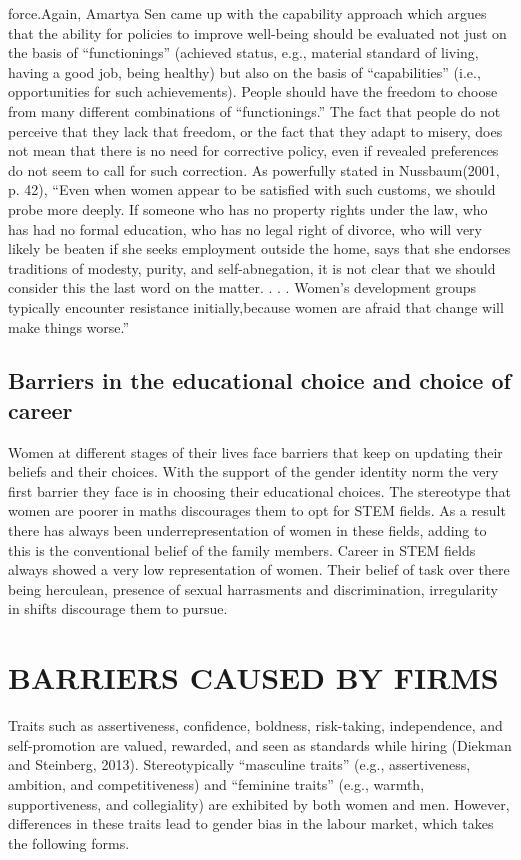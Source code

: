\documentclass[12pt]{article}
\begin{document}
force.Again, Amartya Sen came up with the capability approach which argues that the ability
for policies to improve well-being should be evaluated not just on the basis of “functionings”
(achieved status, e.g., material standard of living, having a good job, being healthy) but also
on the basis of “capabilities” (i.e., opportunities for such achievements). People should have
the freedom to choose from many different combinations of “functionings.” The fact that
people do not perceive that they lack that freedom, or the fact that they adapt to misery, does
not mean that there is no need for corrective policy, even if revealed preferences do not seem
to call for such correction. As powerfully stated in Nussbaum(2001, p. 42),
“Even when women appear to be satisfied with such customs, we should probe more
deeply. If someone who has no property rights under the law, who has had no formal
education, who has no legal right of divorce, who will very likely be beaten if she
seeks employment outside the home, says that she endorses traditions of modesty,
purity, and self-abnegation, it is not clear that we should consider this the last word on
the matter. . . . Women’s development groups typically encounter resistance
initially,because women are afraid that change will make things worse.”


\subsection{Barriers in the educational choice and choice of career}
Women at different stages of their lives face barriers that keep on updating their beliefs and
their choices. With the support of the gender identity norm the very first barrier they face is in
choosing their educational choices. The stereotype that women are poorer in maths
discourages them to opt for STEM fields. As a result there has always been
underrepresentation of women in these fields, adding to this is the conventional belief of the
family members. Career in STEM fields always showed a very low representation of women.
Their belief of task over there being herculean, presence of sexual harrasments and
discrimination, irregularity in shifts discourage them to pursue.


\section{BARRIERS CAUSED BY FIRMS}
Traits such as assertiveness, confidence, boldness, risk-taking, independence, and
self-promotion are valued, rewarded, and seen as standards while hiring (Diekman and
Steinberg, 2013). Stereotypically “masculine traits” (e.g., assertiveness, ambition, and
competitiveness) and “feminine traits” (e.g., warmth, supportiveness, and collegiality) are
exhibited by both women and men. However, differences in these traits lead to gender bias in
the labour market, which takes the following forms.
\end{document}
